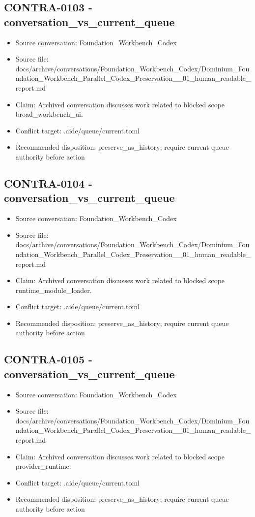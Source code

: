 \documentclass[11pt,a4paper]{report}
\begin{document}
\subsection{CONTRA-0103 - conversation\_vs\_current\_queue}

\begin{itemize}
\item Source conversation: Foundation\_Workbench\_Codex
\item Source file: docs/archive/conversations/Foundation\_Workbench\_Codex/Dominium\_Foundation\_Workbench\_Parallel\_Codex\_Preservation\_\_01\_human\_readable\_report.md
\item Claim: Archived conversation discusses work related to blocked scope broad\_workbench\_ui.
\item Conflict target: .aide/queue/current.toml
\item Recommended disposition: preserve\_as\_history; require current queue authority before action
\end{itemize}

\subsection{CONTRA-0104 - conversation\_vs\_current\_queue}

\begin{itemize}
\item Source conversation: Foundation\_Workbench\_Codex
\item Source file: docs/archive/conversations/Foundation\_Workbench\_Codex/Dominium\_Foundation\_Workbench\_Parallel\_Codex\_Preservation\_\_01\_human\_readable\_report.md
\item Claim: Archived conversation discusses work related to blocked scope runtime\_module\_loader.
\item Conflict target: .aide/queue/current.toml
\item Recommended disposition: preserve\_as\_history; require current queue authority before action
\end{itemize}

\subsection{CONTRA-0105 - conversation\_vs\_current\_queue}

\begin{itemize}
\item Source conversation: Foundation\_Workbench\_Codex
\item Source file: docs/archive/conversations/Foundation\_Workbench\_Codex/Dominium\_Foundation\_Workbench\_Parallel\_Codex\_Preservation\_\_01\_human\_readable\_report.md
\item Claim: Archived conversation discusses work related to blocked scope provider\_runtime.
\item Conflict target: .aide/queue/current.toml
\item Recommended disposition: preserve\_as\_history; require current queue authority before action
\end{itemize}
\end{document}
